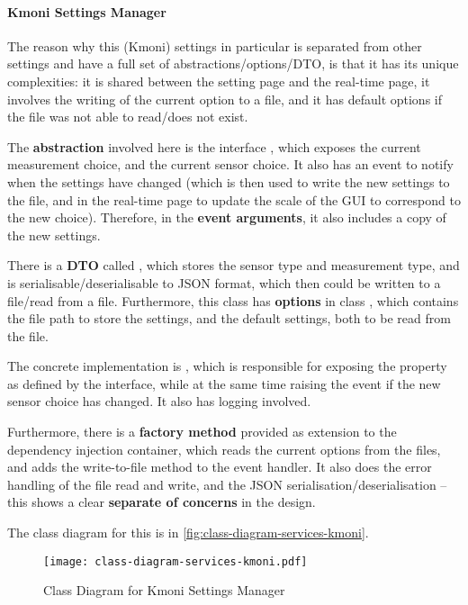 \paragraph{Kmoni Settings Manager}

The reason why this (Kmoni) settings in particular is separated from other settings and have a full set of abstractions/options/DTO, is that it has its unique complexities: it is shared between the setting page and the real-time page, it involves the writing of the current option to a file, and it has default options if the file was not able to read/does not exist.

The \textbf{abstraction} involved here is the interface , which exposes the current measurement choice, and the current sensor choice. It also has an event to notify when the settings have changed (which is then used to write the new settings to the file, and in the real-time page to update the scale of the GUI to correspond to the new choice). Therefore, in the \textbf{event arguments}, it also includes a copy of the new settings.

There is a \textbf{DTO} called , which stores the sensor type and measurement type, and is serialisable/deserialisable to JSON format, which then could be written to a file/read from a file. Furthermore, this class has \textbf{options} in class , which contains the file path to store the settings, and the default settings, both to be read from the  file.

The concrete implementation is , which is responsible for exposing the property as defined by the interface, while at the same time raising the event if the new sensor choice has changed. It also has logging involved.

Furthermore, there is a \textbf{factory method} provided as extension to the dependency injection container, which reads the current options from the files, and adds the write-to-file method to the event handler. It also does the error handling of the file read and write, and the JSON serialisation/deserialisation -- this shows a clear \textbf{separate of concerns} in the design.

The class diagram for this is in \autoref{fig:class-diagram-services-kmoni}.

\begin{figure}[htp]
    \centering
    \texttt{[image: class-diagram-services-kmoni.pdf]}
    \caption{Class Diagram for Kmoni Settings Manager}
    \label{fig:class-diagram-services-kmoni}
\end{figure}

